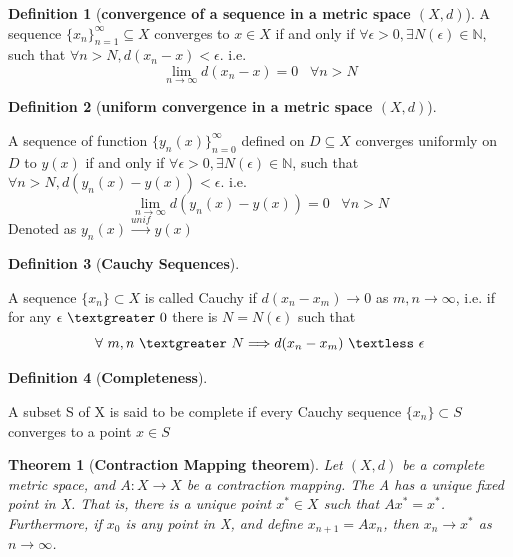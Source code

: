 \documentclass{article}
\newtheorem{theorem}{Theorem}[section]
\theoremstyle{definition}
\newtheorem{definition}{Definition}[section]
\theoremstyle{remark}
\begin{document}
\begin{definition}[\textbf{convergence of a sequence in a metric space $(X,d)$}]\label{def:ConvMetric}
    A sequence $\{x_n\}_{n=1}^{\infty} \subseteq X$ converges to $x \in X$ if and only if $\forall \epsilon > 0, \exists N(\epsilon) \in \mathbb{N}$, such that $\forall n > N, d(x_n - x) < \epsilon$. i.e. 
    \begin{equation}\label{eqn:ConvMetric}
        \lim_{n \to \infty}{d(x_n - x) = 0} \;\;\; \forall n > N
    \end{equation}
\end{definition}

\begin{definition}[\textbf{uniform convergence in a metric space $(X,d)$}]\label{def:uniConvMetric}

    A sequence of function $\{y_n(x)\}_{n = 0}^{\infty}$ defined on $D \subseteq X$ converges uniformly on $D$ to $y(x)$ if and only if $\forall \epsilon > 0, \exists N(\epsilon) \in \mathbb{N}$, such that $\forall n > N, d(y_n(x) - y(x)) < \epsilon$. i.e.
        \begin{equation}
            \lim_{n \to \infty}{d(y_n(x) - y(x))} = 0 \;\;\; \forall n > N
        \end{equation}
    Denoted as $y_n(x) \xrightarrow{unif} y(x)$
\end{definition}

\begin{definition}[\textbf{Cauchy Sequences}]\label{def:cauchySeq}

    A sequence $\{x_n\} \subset X$ is called Cauchy if $d(x_n - x_m) \rightarrow 0$ as $m,n \rightarrow \infty$, i.e. if for any $\epsilon \ \textgreater\ 0$ there is $N = N(\epsilon)$ such that
        \begin{equation}
            \forall\ m,n\ \textgreater\ N \Longrightarrow d(x_n - x_m)\ \textless \ \epsilon
        \end{equation}
\end{definition}

\begin{definition}[\textbf{Completeness}]\label{def:completeness}

    A subset S of X is said to be complete if every Cauchy sequence $\{x_n\} \subset S$ converges to a point $x \in S$
\end{definition}

\begin{theorem}[\textbf{Contraction Mapping theorem}]\label{thm:CMT}
    Let $(X,d)$ be a complete metric space, and $A:X\rightarrow X$ be a contraction mapping. The A has a unique fixed point in X. That is, there is a unique point $x^*\in X$ such that $Ax^* = x^*$. Furthermore, if $x_0$ is any point in X, and define $x_{n+1} = Ax_n$, then $x_n \rightarrow x^*$ as $n \rightarrow \infty$.
\end{theorem}

\newpage

\newpage


\end{document}

